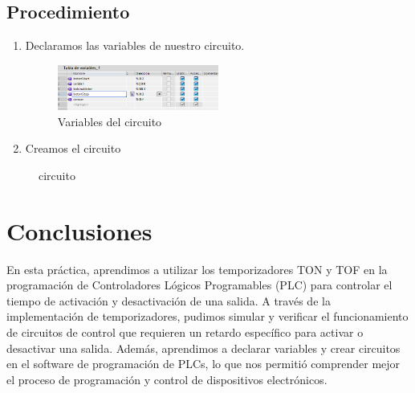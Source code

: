 \documentclass[12pt]{report}
\begin{document}
\section{Procedimiento}
\begin{enumerate}
  \item Declaramos las variables de nuestro circuito.
        \begin{figure}[H]
          \centering
          \includegraphics[width=0.5\textwidth]{screenshots/variables.png}
          \caption{Variables del circuito}
          \label{fig:variables}
        \end{figure}
  \item Creamos el circuito

\end{enumerate}
\newpage
\begin{figure}[H]
  \centering
  \caption{circuito}
  \label{fig:pdfimage}
\end{figure}
\newpage

\chapter{Conclusiones}
En esta práctica, aprendimos a utilizar los temporizadores TON y TOF en la programación de Controladores Lógicos Programables (PLC) para controlar el tiempo de activación y desactivación de una salida. A través de la implementación de temporizadores, pudimos simular y verificar el funcionamiento de circuitos de control que requieren un retardo específico para activar o desactivar una salida. Además, aprendimos a declarar variables y crear circuitos en el software de programación de PLCs, lo que nos permitió comprender mejor el proceso de programación y control de dispositivos electrónicos.
\newpage
\end{document}
